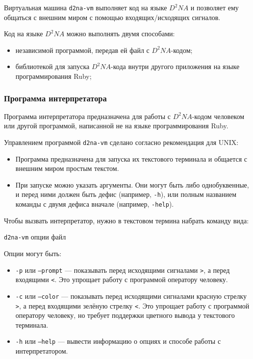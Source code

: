 \documentclass[utf8,a5paper,portrait,10pt,twoside]{eskdtext}
\begin{document}
Виртуальная машина \texttt{d2na-vm} выполняет код на языке $D^2NA$ и позволяет
ему общаться с внешним миром с помощью входящих/исходящих сигналов.

Код на языке $D^2NA$ можно выполнять двумя способами:
\begin{itemize}
  \item независимой программой, передав ей файл с $D^2NA$-кодом;
  \item библиотекой для запуска $D^2NA$-кода внутри другого приложения на языке
        программирования Ruby;
\end{itemize}

\subsubsection{Программа интерпретатора}

Программа интерпретатора предназначена для работы с $D^2NA$-кодом человеком или
другой программой, написанной не на языке программирования Ruby.

Управлением программой \texttt{d2na-vm} сделано согласно рекомендация для
UNIX:
\begin{itemize}
  \item Программа предназначена для запуска их текстового терминала и общается
        с внешним миром простым текстом.
  \item При запуске можно указать аргументы. Они могут быть либо однобуквенные,
        и перед ними должен быть дефис (например, \texttt{-h}), или полным
        названием команды с двумя дефиса вначале (например, \texttt{-help}).
\end{itemize}

Чтобы вызвать интерпретатор, нужно в текстовом термина набрать команду вида:

\texttt{d2na-vm} опции файл

Опции могут быть:

\begin{itemize}
  \item \texttt{-p} или \texttt{--prompt} — показывать перед исходящими
        сигналами \texttt{>}, а перед входящими \texttt{<}. Это упрощает работу
        с программой оператору человеку.
  \item \texttt{-c} или \texttt{--color} — показывать перед исходящими
        сигналами красную стрелку \texttt{>}, а перед входящими зелёную стрелку
        \texttt{<}. Это упрощает работу с программой оператору человеку, но
        требует поддержки цветного вывода у текстового терминала.
  \item \texttt{-h} или \texttt{--help} — вывести информацию о опциях и способе
        работы с интерпретатором.
\end{itemize}
\end{document}
